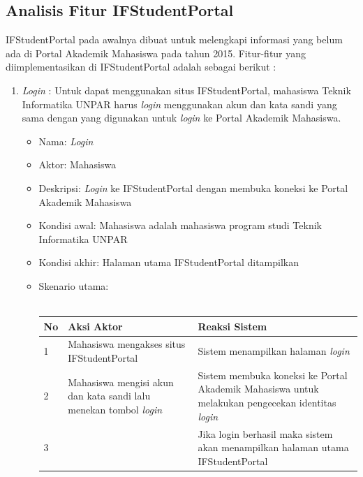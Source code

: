 \subsection{Analisis Fitur IFStudentPortal}
IFStudentPortal pada awalnya dibuat untuk melengkapi informasi yang belum ada di Portal Akademik Mahasiswa pada tahun 2015. Fitur-fitur yang diimplementasikan di IFStudentPortal adalah sebagai berikut : 
\begin{enumerate}
    \item \textit{Login} : 
    Untuk dapat menggunakan situs IFStudentPortal, mahasiswa Teknik Informatika UNPAR harus \textit{login} menggunakan akun dan kata sandi yang sama dengan yang digunakan untuk \textit{login} ke Portal Akademik Mahasiswa. 
    \begin{itemize}
			\item Nama: \textit{Login}
			\item Aktor: Mahasiswa
			\item Deskripsi: \textit{Login} ke IFStudentPortal dengan membuka koneksi ke Portal Akademik Mahasiswa
			\item Kondisi awal: Mahasiswa adalah mahasiswa program studi Teknik Informatika UNPAR
			\item Kondisi akhir: Halaman utama IFStudentPortal ditampilkan 
			\item Skenario utama: \\ \\
        \begin{tabular}{|p{0.5cm} |p{6cm}| p{6cm}|}
        \hline
            No & Aksi Aktor &  Reaksi Sistem \\ \hline     
            1 & Mahasiswa mengakses situs IFStudentPortal &  Sistem menampilkan halaman \textit{login}\\ \hline 
            2 & Mahasiswa mengisi akun dan kata sandi lalu menekan tombol \textit{login} & Sistem membuka koneksi ke Portal Akademik Mahasiswa untuk melakukan pengecekan identitas \textit{login} \\ \hline 
            3 & & Jika login berhasil maka sistem akan menampilkan halaman utama IFStudentPortal\\ \hline 
        \end{tabular}
    \end{itemize}
    \begin{figure}[H]
				\centering

\end{figure}
\end{enumerate}
